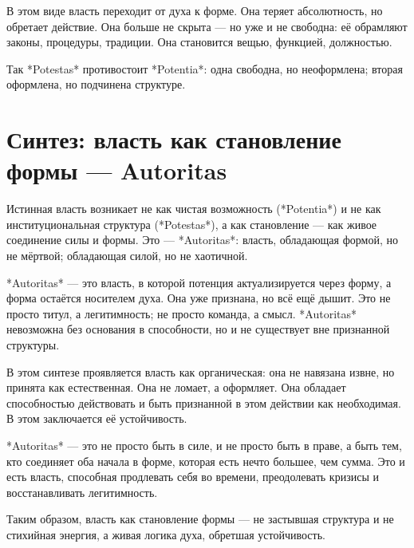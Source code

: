 В этом виде власть переходит от духа к форме. Она теряет абсолютность, но обретает действие. Она больше не скрыта — но уже и не свободна: её обрамляют законы, процедуры, традиции. Она становится вещью, функцией, должностью.

Так *Potestas* противостоит *Potentia*: одна свободна, но неоформлена; вторая оформлена, но подчинена структуре.

\section{Синтез: власть как становление формы — Autoritas}

Истинная власть возникает не как чистая возможность (*Potentia*) и не как институциональная структура (*Potestas*), а как становление — как живое соединение силы и формы. Это — *Autoritas*: власть, обладающая формой, но не мёртвой; обладающая силой, но не хаотичной.

*Autoritas* — это власть, в которой потенция актуализируется через форму, а форма остаётся носителем духа. Она уже признана, но всё ещё дышит. Это не просто титул, а легитимность; не просто команда, а смысл. *Autoritas* невозможна без основания в способности, но и не существует вне признанной структуры.

В этом синтезе проявляется власть как органическая: она не навязана извне, но принята как естественная. Она не ломает, а оформляет. Она обладает способностью действовать и быть признанной в этом действии как необходимая. В этом заключается её устойчивость.

*Autoritas* — это не просто быть в силе, и не просто быть в праве, а быть тем, кто соединяет оба начала в форме, которая есть нечто большее, чем сумма. Это и есть власть, способная продлевать себя во времени, преодолевать кризисы и восстанавливать легитимность.

Таким образом, власть как становление формы — не застывшая структура и не стихийная энергия, а живая логика духа, обретшая устойчивость.
